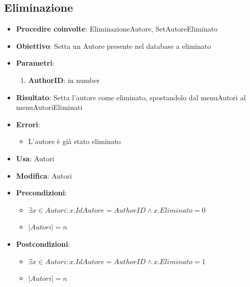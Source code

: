 \subsection{Eliminazione}
\begin{itemize}
	\item \textbf{Procedire coinvolte}: EliminazioneAutore, SetAutoreEliminato
	\item \textbf{Obiettivo}: Setta un Autore presente nel database a eliminato
	\item \textbf{Parametri}:
	\begin{enumerate}
		\item \textbf{AuthorID}: in number
	\end{enumerate}
	\item \textbf{Risultato}: Setta l'autore come eliminato, spostandolo dal menuAutori al menuAutoriEliminati
	\item \textbf{Errori}: 
	\begin{itemize}
		\item L'autore è già stato eliminato
	\end{itemize}
	\item \textbf{Usa}: Autori
	\item \textbf{Modifica}: Autori
	\item \textbf{Precondizioni}:
	\begin{itemize}
		\item $\exists x \in Autori : x.IdAutore = AuthorID \land x.Eliminato = 0$
		\item $|Autori| = n$
	\end{itemize}
	\item \textbf{Postcondizioni}:
	\begin{itemize}
		\item $\exists x \in Autori : x.IdAutore = AuthorID \land x.Eliminato = 1$
		\item $|Autori| = n$
	\end{itemize}
\end{itemize}


